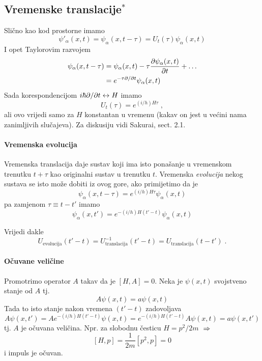 \subsection{Vremenske translacije$^*$}

Slično kao kod prostorne imamo
\begin{displaymath}
 \psi'_{\alpha}(x,t) = \psi_{\alpha}(x,t-\tau) = U_{t}(\tau)\psi_{\alpha}(x,t)
\end{displaymath}
I opet Taylorovim razvojem
\begin{equation*}
\begin{split}
 \psi_{\alpha}(x,t-\tau)&=\psi_{\alpha}(x,t)-\tau\frac{\partial\psi_{\alpha}(x,t)}
{\partial t}+\ldots \\
&=e^{-\tau \partial / \partial  t} \psi_{\alpha}(x,t)
\end{split}
\end{equation*}
Sada korespondencijom $i\hbar\partial /\partial t \leftrightarrow H$
imamo
\begin{displaymath}
U_t(\tau)= e^{(i/h)H\tau} \;,
\end{displaymath}
ali ovo vrijedi samo za $H$ konstantan u vremenu (kakav on jest u većini
nama zanimljivih slučajeva). Za diskusiju vidi Sakurai, sect. 2.1.

\paragraph{Vremenska evolucija}
Vremenska translacija daje sustav koji ima isto ponašanje u vremenskom
trenutku $t+\tau$ kao originalni sustav u trenutku $t$. Vremenska
\emph{evolucija} nekog sustava se isto može dobiti iz ovog gore, ako
primijetimo da je
\begin{displaymath}
\psi_{\alpha}(x,t-\tau)=e^{(i/h)H\tau}\psi_{\alpha}(x,t)
\end{displaymath}
pa zamjenom $\tau\equiv t-t'$ imamo 
\begin{displaymath}
\psi_{\alpha}(x,t')=e^{-(i/h)H(t'-t)}\psi_{\alpha}(x,t)
\end{displaymath}

Vrijedi dakle
\begin{displaymath}
U_{\text{evolucija}}(t' -t)=U^{-1}_{\text{translacija}}(t' -t)
=U_{\text{translacija}}(t -t') \;.
\end{displaymath}


\paragraph{Očuvane veličine} 
Promotrimo operator $A$ takav da je
$[H,A]=0$. Neka je $\psi(x,t)$ svojstveno stanje od $A$ tj.
\[
  A\psi(x,t) = a \psi(x,t)
\]
Tada to isto stanje nakon vremena $(t'-t)$ zadovoljava
\[
  A\psi(x,t')= A e^{-(i/h)H(t'-t)} \psi(x,t) =
 e^{-(i/h)H(t'-t)} A \psi(x,t) = a \psi(x,t')
\]
tj. $A$ je očuvana veličina. Npr. za slobodnu česticu $H=p^2/2m$ 
$\;\Rightarrow\;$ 
\[
   [H,p]=\frac{1}{2m}[p^2,p]=0
\]
i impuls je očuvan.

